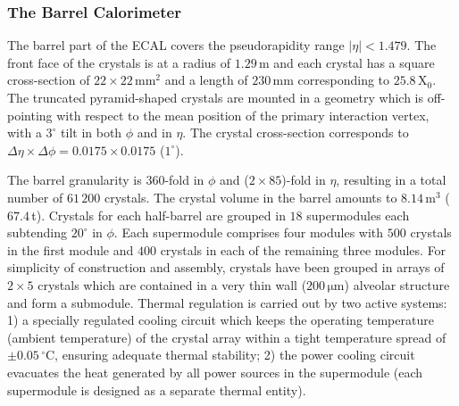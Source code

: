 \subsubsection{The Barrel Calorimeter}
The barrel part of the ECAL covers the pseudorapidity range $|\eta| < 1.479$.
The front face of the crystals is at a radius of $1.29 \,$m and each crystal has a square cross-section of $ 22 \times 22 \,$mm$^2$ and a length of $230 \,$mm corresponding to $25.8 \,$X$_0$. The truncated pyramid-shaped crystals are mounted in a geometry which is off-pointing with respect to the mean position of the primary interaction vertex, with a $3^{\circ}$ tilt in both $\phi$ and in $\eta$. The crystal cross-section corresponds to $\Delta \eta \times \Delta \phi = 0.0175 \times 0.0175$ ($1^{\circ}$). 

The barrel granularity is $360$-fold in $\phi$ and ($2 \times 85$)-fold in $\eta$, resulting in a total number of $61\,200$ crystals. The crystal volume in the barrel amounts to $8.14 \,$m$^3$ ($67.4 \,$t). Crystals for each half-barrel are grouped in $18$ supermodules each subtending $20^{\circ}$ in $\phi$. Each supermodule comprises four modules with $500$ crystals in the first module and $400$ crystals in each of the remaining three modules. For simplicity of construction and assembly, crystals have been grouped in arrays of $2 \times 5$ crystals which are contained in a very thin wall ($200 \,\mathrm{\mu m}$) alveolar structure and form a submodule.  Thermal regulation is carried out by two active systems: 1) a specially regulated cooling circuit which keeps the operating temperature (ambient temperature) of the crystal array within a tight temperature spread of $\pm0.05 \, ^{\circ}$C, ensuring adequate thermal stability; 2) the power cooling circuit evacuates the heat generated by all power sources in the supermodule (each supermodule is designed as a separate thermal entity).


